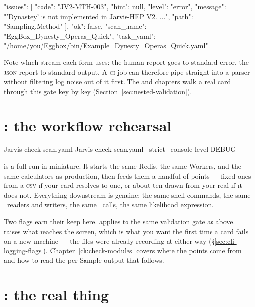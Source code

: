 \begin{terminal}
\begin{jout}
{
  "issues": [
    {
      "code": "JV2-MTH-003",
      "hint": null,
      "level": "error",
      "message": "'Dynastey' is not implemented in Jarvis-HEP V2. ...",
      "path": "Sampling.Method"
    }
  ],
  "ok": false,
  "scan_name": "EggBox_Dynesty_Operas_Quick",
  "task_yaml": "/home/you/Eggbox/bin/Example_Dynesty_Operas_Quick.yaml"
}
\end{jout}
\end{terminal}

Note which stream each form uses: the human report goes to standard error, the
\textsc{json} report to standard output. A \textsc{ci} job can therefore pipe
 straight into a parser without filtering log noise out of it first. The
 and  chapters walk a real card through this gate
key by key (Section~\ref{sec:nested-validation}).

\section{: the workflow rehearsal}
\label{sec:cli-check}

\begin{terminal}
\begin{jcmd}
Jarvis check scan.yaml
Jarvis check scan.yaml --strict --console-level DEBUG
\end{jcmd}
\end{terminal}

 is a full run in miniature. It starts the same Redis, the same Workers, and
the same calculators as production, then feeds them a handful of points --- fixed ones
from a \textsc{csv} if your card resolves to one, or about ten drawn from your real
 if it does not. Everything downstream is genuine: the same
shell commands, the same \Portal\ readers and writers, the same \Operas\ calls, the same
likelihood expression.

Two flags earn their keep here.  applies to the same validation gate as
above.  raises what reaches the screen, which is what you want
the first time a card fails on a new machine --- the files were already recording at
 either way (\S\ref{sec:cli-logging-flags}).
Chapter~\ref{ch:check-modules} covers where the points come from and how to read the
per-Sample output that follows.

\section{: the real thing}
\label{sec:cli-run}

